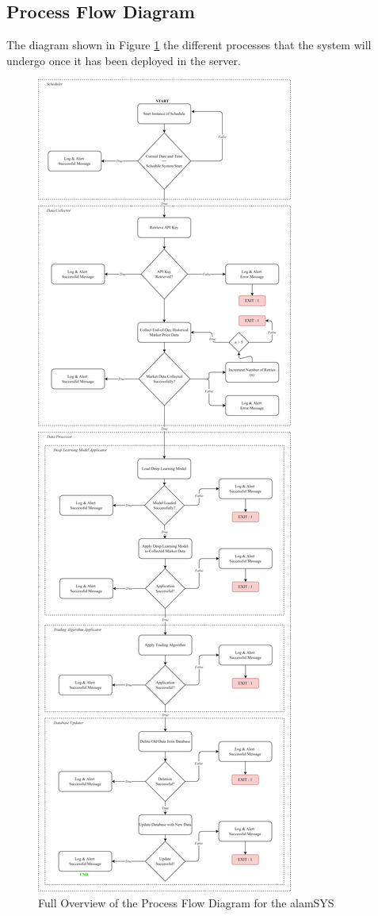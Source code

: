 \subsection{Process Flow Diagram}
\label{subsec:process_flow}
The diagram shown in Figure \ref{fig:process_flowchart} the different processes 
that the system will undergo once it has been deployed in the server.

\begin{figure}[ht]
    \centering
    \includegraphics[height=1\textheight]{./assets/ProcessFlowchart.png}
    \caption{Full Overview of the Process Flow Diagram for the alamSYS}
    \label{fig:process_flowchart}
\end{figure}
\FloatBarrier

